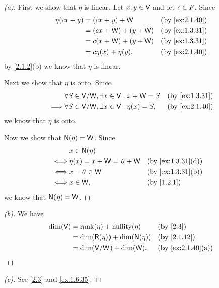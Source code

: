 \begin{proof}[(a)]
	First we show that \(\eta\) is linear.
	Let \(x, y \in \mathsf{V}\) and let \(c \in \mathit{F}\).
	Since
	\begin{align*}
		\eta(cx + y) & = (cx + y) + \W         &  & \by{ex:2.1.40} \\
		             & = (cx + \W) + (y + \W)  &  & \by{ex:1.3.31} \\
		             & = c (x + \W) + (y + \W) &  & \by{ex:1.3.31} \\
		             & = c \eta(x) + \eta(y),  &  & \by{ex:2.1.40}
	\end{align*}
	by \cref{2.1.2}(b) we know that \(\eta\) is linear.

	Next we show that \(\eta\) is onto.
	Since
	\begin{align*}
		         & \forall S \in \V / \W, \exists x \in \V : x + \W = S   &  & \by{ex:1.3.31} \\
		\implies & \forall S \in \V / \W, \exists x \in \V : \eta(x) = S, &  & \by{ex:2.1.40}
	\end{align*}
	we know that \(\eta\) is onto.

	Now we show that \(\ns{\eta} = \W\).
	Since
	\begin{align*}
		     & x \in \ns{\eta}                                    \\
		\iff & \eta(x) = x + \W = \zv + \W &  & \by{ex:1.3.31}[d] \\
		\iff & x - \zv \in \W              &  & \by{ex:1.3.31}[b] \\
		\iff & x \in \W,                   &  & \by{1.2.1}
	\end{align*}
	we know that \(\ns{\eta} = \W\).
\end{proof}

\begin{proof}[(b)]
	We have
	\begin{align*}
		\dim(\V) & = \rk{\eta} + \nt{\eta}             &  & \by{2.3}          \\
		         & = \dim(\rg{\eta}) + \dim(\ns{\eta}) &  & \by{2.1.12}       \\
		         & = \dim(\V / \W) + \dim(\W).         &  & \by{ex:2.1.40}[a]
	\end{align*}
\end{proof}

\begin{proof}[(c)]
	See \cref{2.3} and \cref{ex:1.6.35}.
\end{proof}
